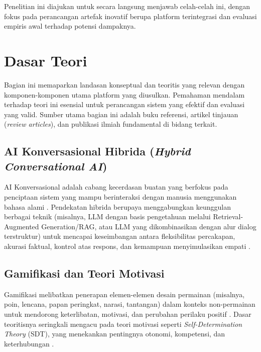 Penelitian ini diajukan untuk secara langsung menjawab celah-celah ini, dengan fokus pada perancangan artefak inovatif berupa platform terintegrasi dan evaluasi empiris awal terhadap potensi dampaknya.


\section{Dasar Teori}
\label{sec:dasar_teori_revised}

Bagian ini memaparkan landasan konseptual dan teoritis yang relevan dengan komponen-komponen utama platform yang diusulkan. Pemahaman mendalam terhadap teori ini esensial untuk perancangan sistem yang efektif dan evaluasi yang valid. Sumber utama bagian ini adalah buku referensi, artikel tinjauan (\textit{review articles}), dan publikasi ilmiah fundamental di bidang terkait.

\subsection{AI Konversasional Hibrida (\textit{Hybrid Conversational AI})}
\label{subsec:teori_ai_detail_revised}
AI Konversasional adalah cabang kecerdasan buatan yang berfokus pada penciptaan sistem yang mampu berinteraksi dengan manusia menggunakan bahasa alami \cite{ai_chatbots_education_advances_2024}. Pendekatan hibrida berupaya menggabungkan keunggulan berbagai teknik (misalnya, LLM dengan basis pengetahuan melalui Retrieval-Augmented Generation/RAG, atau LLM yang dikombinasikan dengan alur dialog terstruktur) untuk mencapai keseimbangan antara fleksibilitas percakapan, akurasi faktual, kontrol atas respons, dan kemampuan menyimulasikan empati \cite{empathetic_conversational_agents_mental_health_2024, hybrid_ai_healthcare_2025}.

\subsection{Gamifikasi dan Teori Motivasi}
\label{subsec:teori_gamifikasi_detail_revised}
Gamifikasi melibatkan penerapan elemen-elemen desain permainan (misalnya, poin, lencana, papan peringkat, narasi, tantangan) dalam konteks non-permainan untuk mendorong keterlibatan, motivasi, dan perubahan perilaku positif \cite{gamification_in_education_boosting_2025, gamification_higher_ed_review_2023}. Dasar teoritisnya seringkali mengacu pada teori motivasi seperti \textit{Self-Determination Theory} (SDT), yang menekankan pentingnya otonomi, kompetensi, dan keterhubungan \cite{sdt_gamification_review_2015}.

